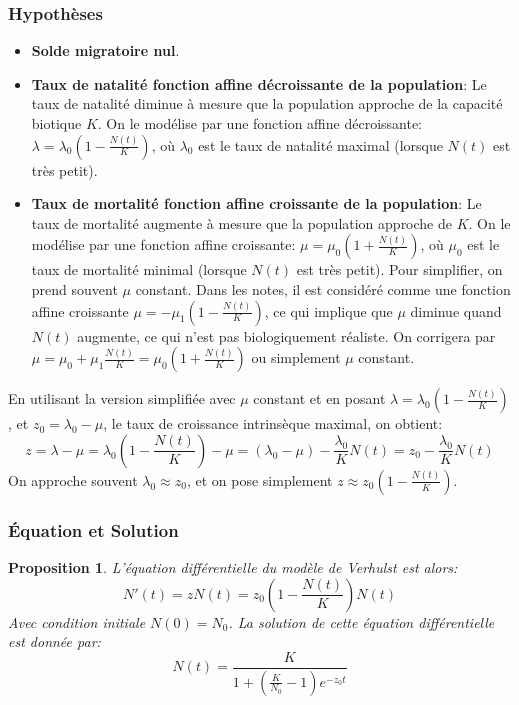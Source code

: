 \documentclass{article}
\newtheorem{proposition}{Proposition}
\begin{document}
\subsubsection{Hypothèses}

\begin{itemize}
    \item \textbf{Solde migratoire nul}.
    \item \textbf{Taux de natalité fonction affine décroissante de la population}: Le taux de natalité diminue à mesure que la population approche de la capacité biotique $K$. On le modélise par une fonction affine décroissante: $\lambda = \lambda_0 (1 - \frac{N(t)}{K})$, où $\lambda_0$ est le taux de natalité maximal (lorsque $N(t)$ est très petit).
    \item \textbf{Taux de mortalité fonction affine croissante de la population}: Le taux de mortalité augmente à mesure que la population approche de $K$. On le modélise par une fonction affine croissante: $\mu = \mu_0 (1 + \frac{N(t)}{K})$, où $\mu_0$ est le taux de mortalité minimal (lorsque $N(t)$ est très petit). Pour simplifier, on prend souvent $\mu$ constant. Dans les notes, il est considéré comme une fonction affine croissante $\mu = -\mu_1 (1 - \frac{N(t)}{K})$, ce qui implique que $\mu$ diminue quand $N(t)$ augmente, ce qui n'est pas biologiquement réaliste. On corrigera par $\mu = \mu_0 + \mu_1 \frac{N(t)}{K} = \mu_0 (1 + \frac{N(t)}{K})$ ou simplement $\mu$ constant.
\end{itemize}
En utilisant la version simplifiée avec $\mu$ constant et en posant $\lambda = \lambda_0 (1 - \frac{N(t)}{K})$, et $z_0 = \lambda_0 - \mu$, le taux de croissance intrinsèque maximal, on obtient:
\[
z = \lambda - \mu = \lambda_0 (1 - \frac{N(t)}{K}) - \mu = (\lambda_0 - \mu) - \frac{\lambda_0}{K} N(t) = z_0 - \frac{\lambda_0}{K} N(t)
\]
On approche souvent $\lambda_0 \approx z_0$, et on pose simplement $z \approx z_0 (1 - \frac{N(t)}{K})$.

\subsubsection{Équation et Solution}
\begin{proposition}
L'équation différentielle du modèle de Verhulst est alors:
\[
N'(t) = z N(t) = z_0 \left(1 - \frac{N(t)}{K}\right) N(t)
\]
Avec condition initiale $N(0) = N_0$. La solution de cette équation différentielle est donnée par:
\[
N(t) = \frac{K}{1 + \left(\frac{K}{N_0} - 1\right) e^{-z_0 t}}
\]
\end{proposition}
\end{document}
